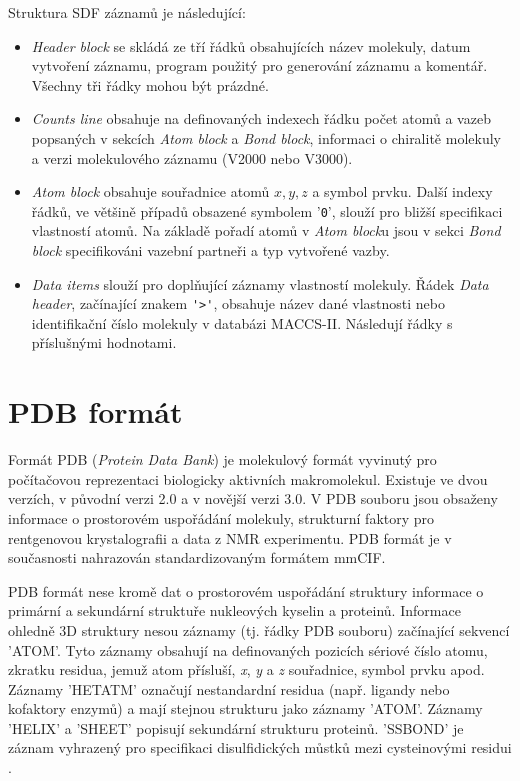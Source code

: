 Struktura SDF záznamů je následující:
\begin{itemize}
    \item \textit{Header block} se skládá ze tří řádků obsahujících název molekuly, datum vytvoření záznamu, program použitý pro generování záznamu a komentář. 
    Všechny tři řádky mohou být prázdné.
    \item \textit{Counts line} obsahuje na definovaných indexech řádku počet atomů a vazeb  popsaných v sekcích \textit{Atom block} a \textit{Bond block}, informaci o chiralitě molekuly a verzi molekulového záznamu (V2000 nebo V3000).
    \item \textit{Atom block} obsahuje souřadnice atomů  $x, y, z$ a symbol prvku. Další indexy řád\-ků, ve většině případů obsazené symbolem '\verb|0|', slouží pro bližší specifikaci vlastností atomů. Na základě pořadí atomů v \textit{Atom block}u jsou v sekci \textit{Bond block} specifikováni vazební partneři a typ vytvořené vazby. 
    \item \textit{Data items} slouží pro doplňující záznamy vlastností molekuly. Řádek \textit{Data header}, začínající znakem \verb|'>'|, obsahuje název dané vlastnosti nebo identifikační číslo molekuly v databázi MACCS-II. Následují řádky s příslušnými hodnotami.
\end{itemize}

\section{PDB formát}
Formát PDB (\textit{Protein Data Bank}) je molekulový formát vyvinutý pro počítačovou reprezentaci biologicky aktivních makromolekul. Existuje ve dvou verzích, v původní verzi 2.0 a v novější verzi 3.0. V PDB souboru jsou obsaženy informace o prostorovém uspořádání molekuly, strukturní faktory pro rentgenovou krystalografii a data z NMR experimentu. PDB formát je v současnosti nahrazován standardizovaným formátem mmCIF.

PDB formát nese kromě dat o prostorovém uspořádání struktury informace o primární a sekundární struktuře nukleových kyselin a proteinů. Informace ohledně 3D struktury nesou záznamy (tj. řádky PDB souboru) začínající sekvencí 'ATOM'. Tyto záznamy obsahují na definovaných pozicích sériové číslo atomu, zkratku residua, jemuž atom přísluší, \textit{x}, \textit{y} a \textit{z} souřadnice, symbol prvku apod. Záznamy 'HETATM' označují nestandardní residua (např. ligandy nebo kofaktory enzymů) a mají stejnou strukturu jako záznamy 'ATOM'. Záznamy 'HELIX' a 'SHEET' popisují sekundární strukturu proteinů. 'SSBOND' je záznam vyhrazený pro specifikaci disulfidických můstků mezi cysteinovými residui \cite{PDB1, PDB2}. 

